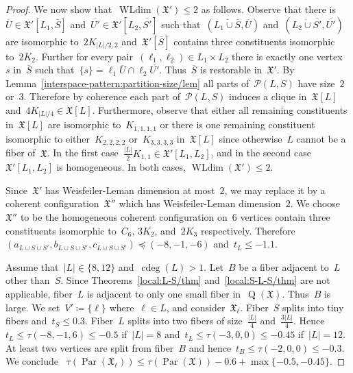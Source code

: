 \documentclass[english,a4paper]{article}
\theoremstyle{plain}
\theoremstyle{definition}
\newcommand{\abs}[1]{| #1 |}
\newcommand{\disjointUnion}{\ensuremath{\mathbin{\dot{\cup}}}}
\newcommand{\coherentConfig}{\ensuremath{\mathfrak{X}}}
\newcommand{\inducedCC}[1]{\ensuremath{\coherentConfig[#1]}}
\DeclareMathOperator*{\WLdim}{WLdim}
\newcommand{\wldim}[1]{\ensuremath{\WLdim\left(#1\right)}}
\DeclareMathOperator*{\Quotient}{Q}
\newcommand{\quotientGraph}[1]{\ensuremath{\Quotient(#1)}}
\DeclareMathOperator{\ColorDeg}{cdeg}
\newcommand{\colorDeg}[1]{\ensuremath{\ColorDeg\left(#1\right)}}
\newcommand{\equivalenceClasses}[1]{\ensuremath{\mathcal{P}(#1)}}
\DeclareMathOperator{\parameters}{Par}
\newcommand{\clique}[1]{\ensuremath{K_{#1}}}
\newcommand{\cycle}[1]{\ensuremath{C_{#1}}}
\newcommand{\disjointCliques}[2]{\ensuremath{#1 \clique{#2}}}
\newcommand{\matching}[1]{\ensuremath{#1 K_{1,1}}}
\begin{document}
\begin{proof}
    We now show that~$\wldim{\coherentConfig'} \leq 2$ as follows.
    Observe that there is~$\overline{U} \in \coherentConfig'[L_1,\overline{S}]$ and~$\overline{U'} \in \coherentConfig'[L_2,\overline{S'}]$ such that~$(L_1 \disjointUnion \overline{S},\overline{U})$ and~$(L_2 \disjointUnion \overline{S'},\overline{U'})$ are isomorphic to~$\disjointCliques{2}{|L|/2,2}$ and~$\coherentConfig'[\overline{S}]$ contains three constituents isomorphic to~$\disjointCliques{2}{2}$.
    Further for every pair~$(\ell_1,\ell_2) \in L_1 \times L_2$ there is exactly one vertex~$s$ in~$\overline{S}$ such that~$\{s\} = \ell_1 \overline{U} \cap \ell_2 \overline{U'}$.
    Thus~$\overline{S}$ is restorable in~$\coherentConfig'$.
    By Lemma~\ref{interspace-pattern:partition-size/lem} all parts of~$\equivalenceClasses{L,S}$ have size~$2$ or~$3$.
    Therefore by coherence each part of~$\equivalenceClasses{L,S}$ induces a clique in~$\coherentConfig[L]$ and~$\disjointCliques{4}{|L|/4} \in \inducedCC{L}$.
    Furthermore, observe that either all remaining constituents in~$\inducedCC{L}$ are isomorphic to~$\clique{1,1,1,1}$ or there is one remaining constituent isomorphic to either~$\clique{2,2,2,2}$ or~$\clique{3,3,3,3}$ in~$\inducedCC{L}$ since otherwise~$L$ cannot be a fiber of~$\coherentConfig$.
    In the first case~$\matching{\frac{|L|}{2}} \in \coherentConfig'[L_1,L_2]$, and in the second case~$\coherentConfig'[L_1,L_2]$ is homogeneous.
    In both cases, $\wldim{\coherentConfig'} \leq 2$.

    Since~$\coherentConfig'$ has Weisfeiler-Leman dimension at most~$2$, we may replace it by a coherent configuration~$\coherentConfig''$ which has Weisfeiler-Leman dimension~$2$.
    We choose~$\coherentConfig''$ to be the homogeneous coherent configuration on~$6$ vertices contain three constituents isomorphic to~$\cycle{6}$, $\disjointCliques{3}{2}$, and~$\disjointCliques{2}{3}$ respectively.
    Therefore~$(a_{L\cup S \cup S'},b_{L\cup S \cup S'},c_{L\cup S \cup S'}) \preceq (-8,-1,-6)$ and~$t_L \leq -1.1$.

    Assume that~$\abs{L} \in \{8,12\}$ and~$\colorDeg{L} > 1$.
    Let~$B$ be a fiber adjacent to~$L$ other than~$S$.
    Since Theorems~\ref{local:L-S/thm} and~\ref{local:S-L-S/thm} are not applicable, fiber~$L$ is adjacent to only one small fiber in~$\quotientGraph{\coherentConfig}$.
    Thus~$B$ is large.
    We set~$V' \coloneqq\{\ell\}$ where~$\ell \in L$, and consider~$\coherentConfig_{\ell}$.
    Fiber~$S$ splits into tiny fibers and~$t_S \leq 0.3$.
    Fiber~$L$ splits into two fibers of size~$\frac{|L|}{4}$ and~$\frac{3|L|}{4}$.
    Hence~$t_L \leq \tau(-8,-1,6) \leq -0.5$ if~$|L| = 8$ and~$t_L \leq \tau(-3,0,0) \leq -0.45$ if~$|L| = 12$.
    At least two vertices are split from fiber~$B$ and hence~$t_B \leq \tau(-2,0,0) \leq -0.3$.
    We conclude~ $\tau(\parameters(\coherentConfig_\ell)) \leq \tau(\parameters(\coherentConfig)) - 0.6 + \max\{-0.5,-0.45\}$.
\end{proof}
\end{document}
